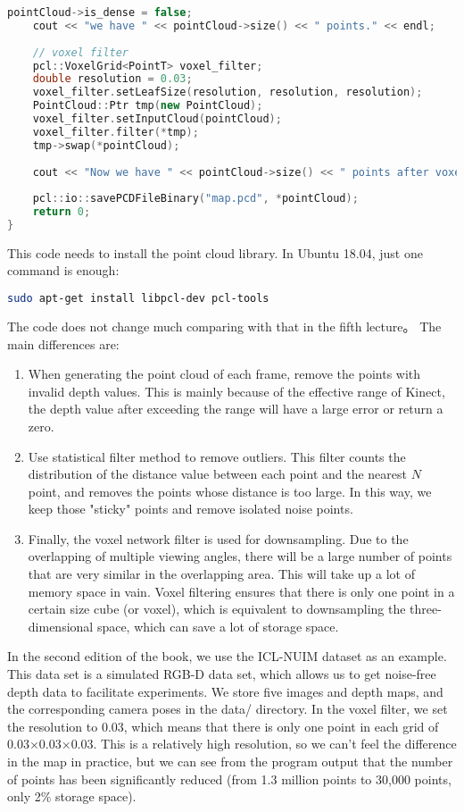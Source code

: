 \begin{lstlisting}[language=c++,caption=slambook/ch12/dense\_RGBD/pointcloud\_mapping.cpp (part)]
	pointCloud->is_dense = false;
	cout << "we have " << pointCloud->size() << " points." << endl;
	
	// voxel filter 
	pcl::VoxelGrid<PointT> voxel_filter;
	double resolution = 0.03;
	voxel_filter.setLeafSize(resolution, resolution, resolution);       // resolution
	PointCloud::Ptr tmp(new PointCloud);
	voxel_filter.setInputCloud(pointCloud);
	voxel_filter.filter(*tmp);
	tmp->swap(*pointCloud);
	
	cout << "Now we have " << pointCloud->size() << " points after voxel filtering." << endl;
	
	pcl::io::savePCDFileBinary("map.pcd", *pointCloud);
	return 0;
}
\end{lstlisting}

This code needs to install the point cloud library. In Ubuntu 18.04, just one command is enough:
\begin{lstlisting}[language=sh, caption=Terminal input:]
	sudo apt-get install libpcl-dev pcl-tools
\end{lstlisting}

The code does not change much comparing with that in the fifth lecture。 The main differences are:
\begin{enumerate}
	\item When generating the point cloud of each frame, remove the points with invalid depth values. This is mainly because of the effective range of Kinect, the depth value after exceeding the range will have a large error or return a zero.
	\item Use statistical filter method to remove outliers. This filter counts the distribution of the distance value between each point and the nearest $N$ point, and removes the points whose distance is too large. In this way, we keep those "sticky" points and remove isolated noise points.
	\item Finally, the voxel network filter is used for downsampling. Due to the overlapping of multiple viewing angles, there will be a large number of points that are very similar in the overlapping area. This will take up a lot of memory space in vain. Voxel filtering ensures that there is only one point in a certain size cube (or voxel), which is equivalent to downsampling the three-dimensional space, which can save a lot of storage space.
\end{enumerate}

In the second edition of the book, we use the ICL-NUIM dataset as an example. This data set is a simulated RGB-D data set, which allows us to get noise-free depth data to facilitate experiments. We store five images and depth maps, and the corresponding camera poses in the data/ directory. In the voxel filter, we set the resolution to 0.03, which means that there is only one point in each grid of 0.03$\times$0.03$\times$0.03. This is a relatively high resolution, so we can't feel the difference in the map in practice, but we can see from the program output that the number of points has been significantly reduced (from 1.3 million points to 30,000 points, only 2$ \%$ storage space).

